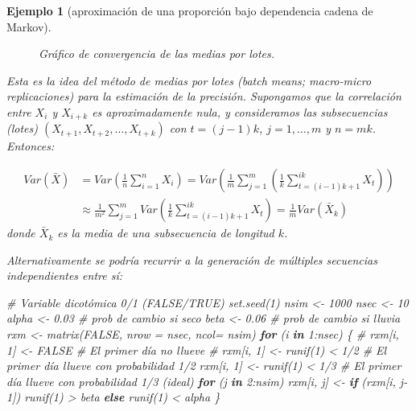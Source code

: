\documentclass[
]{book}
\newenvironment{Shaded}{\begin{snugshade}}{\end{snugshade}}
\newcommand{\AttributeTok}[1]{\textcolor[rgb]{0.77,0.63,0.00}{#1}}
\newcommand{\CommentTok}[1]{\textcolor[rgb]{0.56,0.35,0.01}{\textit{#1}}}
\newcommand{\ConstantTok}[1]{\textcolor[rgb]{0.00,0.00,0.00}{#1}}
\newcommand{\ControlFlowTok}[1]{\textcolor[rgb]{0.13,0.29,0.53}{\textbf{#1}}}
\newcommand{\DecValTok}[1]{\textcolor[rgb]{0.00,0.00,0.81}{#1}}
\newcommand{\FloatTok}[1]{\textcolor[rgb]{0.00,0.00,0.81}{#1}}
\newcommand{\FunctionTok}[1]{\textcolor[rgb]{0.00,0.00,0.00}{#1}}
\newcommand{\NormalTok}[1]{#1}
\newcommand{\OtherTok}[1]{\textcolor[rgb]{0.56,0.35,0.01}{#1}}
\newcommand{\SpecialCharTok}[1]{\textcolor[rgb]{0.00,0.00,0.00}{#1}}
\theoremstyle{break}
\newtheorem{example}{Ejemplo}[chapter]
\theoremstyle{nonumberplain}
\begin{document}
\begin{example}[aproximación de una proporción bajo dependencia cadena de Markov]
\begin{figure}[!htb]
\caption{Gráfico de convergencia de las medias por lotes.}\label{fig:conv-dep-lotes}
\end{figure}

Esta es la idea del método de medias por lotes (\emph{batch means}; \emph{macro-micro replicaciones}) para la estimación de la precisión.
Supongamos que la correlación entre \(X_i\) y \(X_{i+k}\) es aproximadamente nula, y consideramos las subsecuencias (lotes) \((X_{t+1},X_{t+2},\ldots,X_{t+k})\) con \(t=(j-1)k\), \(j=1,\ldots,m\) y \(n = mk\).
Entonces:

\[\begin{aligned}
Var \left(\bar X \right) &= Var \left(\frac{1}{n} \sum_{i=1}^n X_i\right) 
= Var \left( \frac{1}{m}\sum_{j=1}^m \left(\frac{1}{k} \sum_{t=(i-1)k + 1}^{ik} X_t\right) \right) \\
&\approx \frac{1}{m^2} \sum_{j=1}^m Var \left(\frac{1}{k} \sum_{t=(i-1)k + 1}^{ik} X_t\right)
= \frac{1}{m} Var \left(\bar{X}_k \right)
\end{aligned}\]
donde \(\bar{X}_k\) es la media de una subsecuencia de longitud \(k\).

Alternativamente se podría recurrir a la generación de múltiples secuencias independientes entre sí:

\begin{Shaded}
\begin{Highlighting}[]
\CommentTok{\# Variable dicotómica 0/1 (FALSE/TRUE)  }
\FunctionTok{set.seed}\NormalTok{(}\DecValTok{1}\NormalTok{)}
\NormalTok{nsim }\OtherTok{\textless{}{-}} \DecValTok{1000}
\NormalTok{nsec }\OtherTok{\textless{}{-}} \DecValTok{10}
\NormalTok{alpha }\OtherTok{\textless{}{-}} \FloatTok{0.03} \CommentTok{\# prob de cambio si seco}
\NormalTok{beta }\OtherTok{\textless{}{-}} \FloatTok{0.06}  \CommentTok{\# prob de cambio si lluvia}
\NormalTok{rxm }\OtherTok{\textless{}{-}} \FunctionTok{matrix}\NormalTok{(}\ConstantTok{FALSE}\NormalTok{, }\AttributeTok{nrow =}\NormalTok{ nsec, }\AttributeTok{ncol=}\NormalTok{ nsim)}
\ControlFlowTok{for}\NormalTok{ (i }\ControlFlowTok{in} \DecValTok{1}\SpecialCharTok{:}\NormalTok{nsec) \{}
  \CommentTok{\# rxm[i, 1] \textless{}{-} FALSE \# El primer día no llueve}
  \CommentTok{\# rxm[i, 1] \textless{}{-} runif(1) \textless{} 1/2 \# El primer día llueve con probabilidad 1/2}
\NormalTok{  rxm[i, }\DecValTok{1}\NormalTok{] }\OtherTok{\textless{}{-}} \FunctionTok{runif}\NormalTok{(}\DecValTok{1}\NormalTok{) }\SpecialCharTok{\textless{}} \DecValTok{1}\SpecialCharTok{/}\DecValTok{3} \CommentTok{\# El primer día llueve con probabilidad 1/3 (ideal)}
  \ControlFlowTok{for}\NormalTok{ (j }\ControlFlowTok{in} \DecValTok{2}\SpecialCharTok{:}\NormalTok{nsim)}
\NormalTok{    rxm[i, j] }\OtherTok{\textless{}{-}} \ControlFlowTok{if}\NormalTok{ (rxm[i, j}\DecValTok{{-}1}\NormalTok{]) }\FunctionTok{runif}\NormalTok{(}\DecValTok{1}\NormalTok{) }\SpecialCharTok{\textgreater{}}\NormalTok{ beta }\ControlFlowTok{else} \FunctionTok{runif}\NormalTok{(}\DecValTok{1}\NormalTok{) }\SpecialCharTok{\textless{}}\NormalTok{ alpha}
\NormalTok{\}}
\end{Highlighting}
\end{Shaded}


\end{example}
\end{document}
